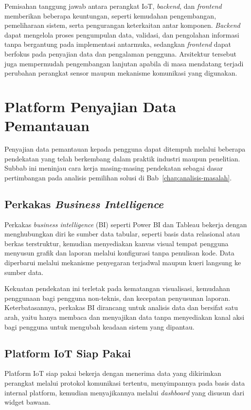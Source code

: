 Pemisahan tanggung jawab antara perangkat IoT, \textit{backend}, dan \textit{frontend} memberikan
beberapa keuntungan, seperti kemudahan pengembangan, pemeliharaan sistem, serta
pengurangan keterkaitan antar komponen. \textit{Backend} dapat mengelola proses
pengumpulan data, validasi, dan pengolahan informasi tanpa bergantung pada
implementasi antarmuka, sedangkan \textit{frontend} dapat berfokus pada penyajian data
dan pengalaman pengguna. Arsitektur tersebut juga mempermudah pengembangan
lanjutan apabila di masa mendatang terjadi perubahan perangkat sensor maupun
mekanisme komunikasi yang digunakan.

\section{Platform Penyajian Data Pemantauan}

Penyajian data pemantauan kepada pengguna dapat ditempuh melalui beberapa pendekatan yang telah berkembang dalam
praktik industri maupun penelitian. Subbab ini meninjau cara kerja masing-masing pendekatan sebagai dasar
pertimbangan pada analisis pemilihan solusi di Bab~\ref{chap:analisis-masalah}.

\subsection{Perkakas \textit{Business Intelligence}}
Perkakas \textit{business intelligence} (BI) seperti Power BI dan Tableau bekerja dengan menghubungkan diri ke
sumber data tabular, seperti basis data relasional atau berkas terstruktur, kemudian menyediakan kanvas visual
tempat pengguna menyusun grafik dan laporan melalui konfigurasi tanpa penulisan kode. Data diperbarui melalui
mekanisme penyegaran terjadwal maupun kueri langsung ke sumber data.

Kekuatan pendekatan ini terletak pada kematangan visualisasi, kemudahan penggunaan bagi pengguna non-teknis, dan
kecepatan penyusunan laporan. Keterbatasannya, perkakas BI dirancang untuk analisis data dan bersifat satu arah,
yaitu hanya membaca dan menyajikan data tanpa menyediakan kanal aksi bagi pengguna untuk mengubah keadaan sistem
yang dipantau.

\subsection{Platform IoT Siap Pakai}
Platform IoT siap pakai bekerja dengan menerima data yang dikirimkan perangkat melalui protokol komunikasi
tertentu, menyimpannya pada basis data internal platform, kemudian menyajikannya melalui \textit{dashboard} yang
disusun dari widget bawaan.

